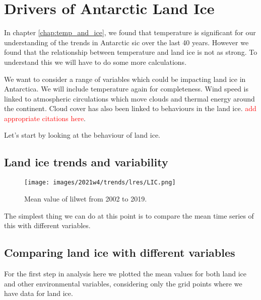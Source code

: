 \documentclass[../main.tex]{subfiles}
\begin{document}
\chapter{Drivers of Antarctic Land Ice}
\label{chap:land_ice}
In chapter \ref{chap:temp_and_ice}, we found that temperature is significant for our understanding of the trends in Antarctic \gls{sic} over the last 40 years. However we found that the relationship between temperature and land ice is not as strong. To understand this we will have to do some more calculations.

We want to consider a range of variables which could be impacting land ice in Antarctica. We will include temperature again for completeness. Wind speed is linked to atmospheric circulations which move clouds and thermal energy around the continent. Cloud cover has also been linked to behaviours in the land ice. \textcolor{red}{add appropriate citations here}. 

Let's start by looking at the behaviour of land ice.

\section{Land ice trends and variability}
 \begin{figure}[H]
     \centering
     \texttt{[image: images/2021w4/trends/lres/LIC.png]}
     \caption{Mean value of \gls{lilwet} from 2002 to 2019.}
     \label{fig:lilwet_mean}
 \end{figure}

The simplest thing we can do at this point is to compare the mean time series of this with different variables.

\section{Comparing land ice with different variables}
For the first step in analysis here we plotted the mean values for both land ice and other environmental variables, considering only the grid points where we have data for land ice.

\section{}
\end{document}
